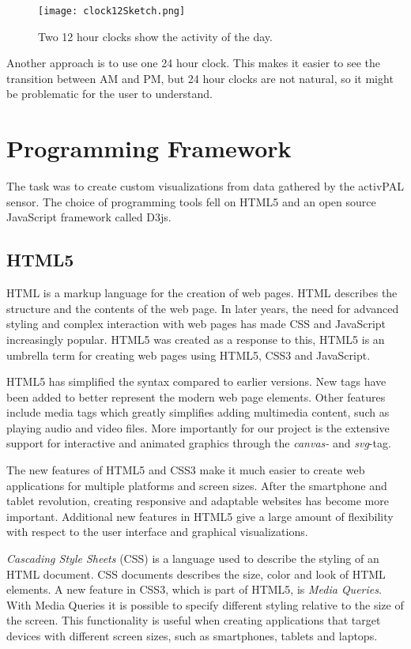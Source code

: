 \begin{figure}[h!]
	\centering
		\texttt{[image: clock12Sketch.png]}
		\caption[T3 sketch]{Two 12 hour clocks show the activity of the day.}
		\label{fig:clock12}
\end{figure}

Another approach is to use one 24 hour clock. This makes it easier to see the transition between AM and PM, but 24 hour clocks are not natural, so it might be problematic for the user to understand.

\section{Programming Framework}
The task was to create custom visualizations from data gathered by the activPAL sensor. The choice of programming tools fell on HTML5 and an open source JavaScript framework called D3js.

\subsection{HTML5}
HTML is a markup language for the creation of web pages. HTML describes the structure and the contents of the web page. In later years, the need for advanced styling and complex interaction with web pages has made CSS and JavaScript increasingly popular. HTML5 was created as a response to this, HTML5 is an umbrella term for creating web pages using HTML5, CSS3 and JavaScript.

HTML5 has simplified the syntax compared to earlier versions. New tags have been added to better represent the modern web page elements. Other features include media tags which greatly simplifies adding multimedia content, such as playing audio and video files. More importantly for our project is the extensive support for interactive and animated graphics through the \emph{canvas-} and \emph{svg}-tag.

The new features of HTML5 and CSS3 make it much easier to create web applications for multiple platforms and screen sizes. After the smartphone and tablet revolution, creating responsive and adaptable websites has become more important. Additional new features in HTML5 give a large amount of flexibility with respect to the user interface and graphical visualizations.

\emph{Cascading Style Sheets} (CSS) is a language used to describe the styling of an HTML document. CSS documents describes the size, color and look of HTML elements. A new feature in CSS3, which is part of HTML5, is \emph{Media Queries}. With Media Queries it is possible to specify different styling relative to the size of the screen. This functionality is useful when creating applications that target devices with different screen sizes, such as smartphones, tablets and laptops. 

